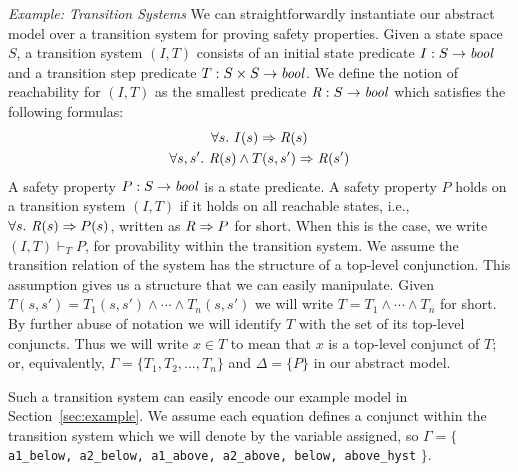 {\em Example: Transition Systems} We can straightforwardly instantiate our abstract model over a transition system for proving safety properties.  Given a state space $S$, a transition system $(I,T)$ consists of an initial state predicate $I : S \to \mathit{bool}$ and a transition step predicate $T : S \times S \to \mathit{bool}$. We define the notion of reachability for $(I, T)$ as the smallest predicate $\mathit{R} : S \to \mathit{bool}$ which satisfies the following formulas:
\begin{gather*}
  \forall s.~ I(s) \Rightarrow \mathit{R}(s) \\
  \forall s, s'.~ \mathit{R}(s) \land T(s, s') \Rightarrow \mathit{R}(s')
\end{gather*}
A safety property $P : S \to \mathit{bool}$ is a state predicate. A safety property $P$ holds on a transition system $(I, T)$ if it holds on all reachable states, i.e., $\forall s.~ \mathit{R}(s) \Rightarrow P(s)$, written as $\mathit{R} \Rightarrow P$ for short. When this is the case, we write $(I, T)\vdash_{T} P$, for provability within the transition system.  We assume the transition relation of the system has the structure of a top-level conjunction. This assumption gives us a structure that we can easily manipulate. Given $T(s, s') = T_1(s, s') \land \cdots \land T_n(s, s')$ we will write $T = T_1 \land \cdots \land T_n$ for short. By further abuse of notation we will identify $T$ with the set of its top-level conjuncts. Thus we will write $x \in T$ to mean that $x$ is a top-level conjunct of $T$; or, equivalently, $\Gamma = \{T_1, T_2, \ldots, T_n\}$ and $\Delta = \{P\}$ in our abstract model.  

Such a transition system can easily encode our example model in Section~\ref{sec:example}.  We assume each equation defines a conjunct within the transition system which we will denote by the variable assigned, so $\Gamma = \{$ {\small \texttt{a1\_below, a2\_below, a1\_above, a2\_above, below, above\_hyst}} $\}$.





